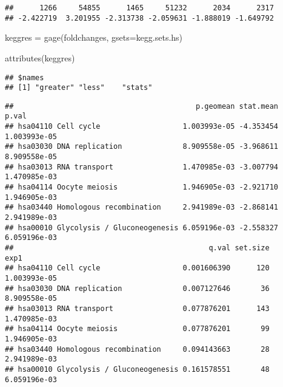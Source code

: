 \documentclass[
]{article}
\newenvironment{Shaded}{\begin{snugshade}}{\end{snugshade}}
\newcommand{\AttributeTok}[1]{\textcolor[rgb]{0.77,0.63,0.00}{#1}}
\newcommand{\FunctionTok}[1]{\textcolor[rgb]{0.00,0.00,0.00}{#1}}
\newcommand{\NormalTok}[1]{#1}
\newcommand{\OtherTok}[1]{\textcolor[rgb]{0.56,0.35,0.01}{#1}}
\newcommand{\SpecialCharTok}[1]{\textcolor[rgb]{0.00,0.00,0.00}{#1}}
\begin{document}
\begin{verbatim}
##      1266     54855      1465     51232      2034      2317 
## -2.422719  3.201955 -2.313738 -2.059631 -1.888019 -1.649792
\end{verbatim}

\begin{Shaded}
\begin{Highlighting}[]
\NormalTok{keggres }\OtherTok{=} \FunctionTok{gage}\NormalTok{(foldchanges, }\AttributeTok{gsets=}\NormalTok{kegg.sets.hs)}
\end{Highlighting}
\end{Shaded}

\begin{Shaded}
\begin{Highlighting}[]
\FunctionTok{attributes}\NormalTok{(keggres)}
\end{Highlighting}
\end{Shaded}

\begin{verbatim}
## $names
## [1] "greater" "less"    "stats"
\end{verbatim}

\begin{Shaded}
\end{Shaded}

\begin{verbatim}
##                                          p.geomean stat.mean        p.val
## hsa04110 Cell cycle                   1.003993e-05 -4.353454 1.003993e-05
## hsa03030 DNA replication              8.909558e-05 -3.968611 8.909558e-05
## hsa03013 RNA transport                1.470985e-03 -3.007794 1.470985e-03
## hsa04114 Oocyte meiosis               1.946905e-03 -2.921710 1.946905e-03
## hsa03440 Homologous recombination     2.941989e-03 -2.868141 2.941989e-03
## hsa00010 Glycolysis / Gluconeogenesis 6.059196e-03 -2.558327 6.059196e-03
##                                             q.val set.size         exp1
## hsa04110 Cell cycle                   0.001606390      120 1.003993e-05
## hsa03030 DNA replication              0.007127646       36 8.909558e-05
## hsa03013 RNA transport                0.077876201      143 1.470985e-03
## hsa04114 Oocyte meiosis               0.077876201       99 1.946905e-03
## hsa03440 Homologous recombination     0.094143663       28 2.941989e-03
## hsa00010 Glycolysis / Gluconeogenesis 0.161578551       48 6.059196e-03
\end{verbatim}
\end{document}
